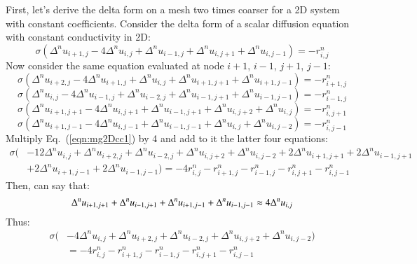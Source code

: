 \documentclass{warpdoc}
\begin{document}
First, let's derive the delta form on a mesh two times coarser for a 2D system with constant coefficients.
Consider the delta form of a scalar diffusion equation with constant conductivity in 2D:
%
\begin{equation}
  \sigma(\Delta^n u_{i+1,j} -4 \Delta^n u_{i,j} +\Delta^n u_{i-1,j}
        +\Delta^n u_{i,j+1}  +\Delta^n u_{i,j-1})
      = -r_{i,j}^n
\label{eqn:mg2Dcc1}
\end{equation}
%
Now consider the same equation evaluated at node $i+1$, $i-1$, $j+1$, $j-1$:
%
\begin{equation}
  \sigma(\Delta^n u_{i+2,j} -4 \Delta^n u_{i+1,j} +\Delta^n u_{i,j}
        +\Delta^n u_{i+1,j+1}  +\Delta^n u_{i+1,j-1})
      = -r_{i+1,j}^n
\label{eqn:mg2Dcc2}
\end{equation}
%
%
\begin{equation}
  \sigma(\Delta^n u_{i,j} -4 \Delta^n u_{i-1,j} +\Delta^n u_{i-2,j}
        +\Delta^n u_{i-1,j+1}  +\Delta^n u_{i-1,j-1})
      = -r_{i-1,j}^n
\label{eqn:mg2Dcc3}
\end{equation}
%
%
\begin{equation}
  \sigma(\Delta^n u_{i+1,j+1} -4 \Delta^n u_{i,j+1} +\Delta^n u_{i-1,j+1}
        +\Delta^n u_{i,j+2}  +\Delta^n u_{i,j})
      = -r_{i,j+1}^n
\label{eqn:mg2Dcc4}
\end{equation}
%
%
\begin{equation}
  \sigma(\Delta^n u_{i+1,j-1} -4 \Delta^n u_{i,j-1} +\Delta^n u_{i-1,j-1}
        +\Delta^n u_{i,j}  +\Delta^n u_{i,j-2})
      = -r_{i,j-1}^n
\label{eqn:mg2Dcc5}
\end{equation}
%
Multiply Eq.\ (\ref{eqn:mg2Dcc1}) by 4 and add to it the latter four equations:
%
\begin{align}
  \sigma(&
        - 12 \Delta^n u_{i,j} 
        +    \Delta^n u_{i+2,j} 
        +    \Delta^n u_{i-2,j}
        +    \Delta^n u_{i,j+2}  
        +    \Delta^n u_{i,j-2}
        + 2  \Delta^n u_{i+1,j+1}  
        + 2  \Delta^n u_{i-1,j+1}\nonumber\\  
        &+ 2  \Delta^n u_{i+1,j-1}
        + 2  \Delta^n u_{i-1,j-1}
       )
      = -4 r_{i,j}^n -r_{i+1,j}^n -r_{i-1,j}^n -r_{i,j+1}^n -r_{i,j-1}^n
\label{eqn:mg2Dcc6}
\end{align}
%
Then, can say that:
%
\begin{equation}
         \Delta^n u_{i+1,j+1}  
        +   \Delta^n u_{i-1,j+1}\\  
        +   \Delta^n u_{i+1,j-1}
        +   \Delta^n u_{i-1,j-1}
\approx 4 \Delta^n u_{i,j}
\end{equation}
%
Thus:
%
\begin{align}
  \sigma(
        &- 4 \Delta^n u_{i,j} 
        +    \Delta^n u_{i+2,j} 
        +    \Delta^n u_{i-2,j}
        +    \Delta^n u_{i,j+2}  
        +    \Delta^n u_{i,j-2}
       )\nonumber\\
      &= -4 r_{i,j}^n -r_{i+1,j}^n -r_{i-1,j}^n -r_{i,j+1}^n -r_{i,j-1}^n
\label{eqn:mg2Dcc7}
\end{align}
%
\end{document}
